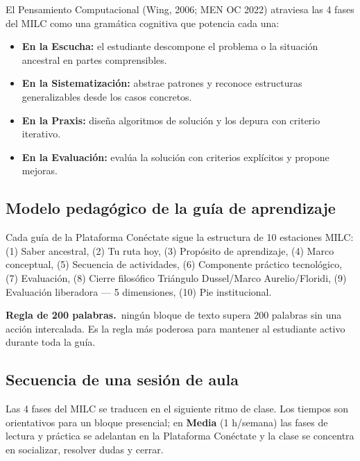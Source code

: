 \documentclass[12pt, a4paper]{article}
\newcommand{\callout}[2]{%
  \begin{tcolorbox}[enhanced, colback=vinoClaro, colframe=vinoInst, boxrule=0pt,
    leftrule=3.5pt, arc=2pt, left=11pt, right=11pt, top=8pt, bottom=8pt]
  {\color{vinoInst}\textbf{#1}}\, #2
  \end{tcolorbox}}
\begin{document}
El Pensamiento Computacional (Wing, 2006; MEN OC 2022) atraviesa las 4 fases del
MILC como una gramática cognitiva que potencia cada una:

\begin{itemize}
  \item \textbf{En la Escucha:} el estudiante descompone el problema o la situación
    ancestral en partes comprensibles.
  \item \textbf{En la Sistematización:} abstrae patrones y reconoce estructuras
    generalizables desde los casos concretos.
  \item \textbf{En la Praxis:} diseña algoritmos de solución y los depura con
    criterio iterativo.
  \item \textbf{En la Evaluación:} evalúa la solución con criterios explícitos y
    propone mejoras.
\end{itemize}

\subsection{Modelo pedagógico de la guía de aprendizaje}

Cada guía de la Plataforma Conéctate sigue la estructura de 10 estaciones MILC:
(1) Saber ancestral, (2) Tu ruta hoy, (3) Propósito de aprendizaje, (4) Marco
conceptual, (5) Secuencia de actividades, (6) Componente práctico tecnológico,
(7) Evaluación, (8) Cierre filosófico Triángulo Dussel/Marco Aurelio/Floridi,
(9) Evaluación liberadora — 5 dimensiones, (10) Pie institucional.

\callout{Regla de 200 palabras.}{ningún bloque de texto supera 200 palabras sin
una acción intercalada. Es la regla más poderosa para mantener al estudiante
activo durante toda la guía.}

\subsection{Secuencia de una sesión de aula}

Las 4 fases del MILC se traducen en el siguiente ritmo de clase. Los tiempos son
orientativos para un bloque presencial; en \textbf{Media} (1 h/semana) las fases de
lectura y práctica se adelantan en la Plataforma Conéctate y la clase se concentra
en socializar, resolver dudas y cerrar.
\end{document}
